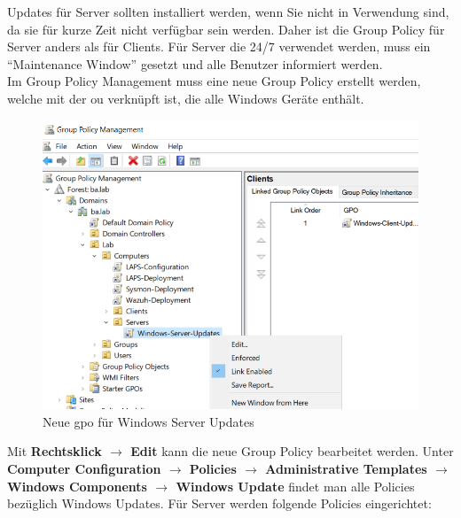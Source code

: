 Updates für Server sollten installiert werden, wenn Sie nicht in Verwendung sind, da sie für kurze Zeit nicht verfügbar sein werden.
Daher ist die Group Policy für Server anders als für Clients.
Für Server die 24/7 verwendet werden, muss ein ``Maintenance Window'' gesetzt und alle Benutzer informiert werden.\\

Im Group Policy Management muss eine neue Group Policy erstellt werden, welche mit der \acrshort{ou} verknüpft ist, die alle Windows Geräte enthält.
\begin{figure}[H]
    \centering
    \includegraphics[width=\linewidth]{../img/Updates/edit-gpo-server.png}
    \caption{Neue \acrshort{gpo} für Windows Server Updates}
\end{figure}

Mit \textbf{Rechtsklick $\rightarrow$ Edit} kann die neue Group Policy bearbeitet werden.
Unter \textbf{Computer Configuration $\rightarrow$ Policies $\rightarrow$ Administrative Templates $\rightarrow$ Windows Components $\rightarrow$ Windows Update} findet man alle Policies bezüglich Windows Updates.
Für Server werden folgende Policies eingerichtet:

